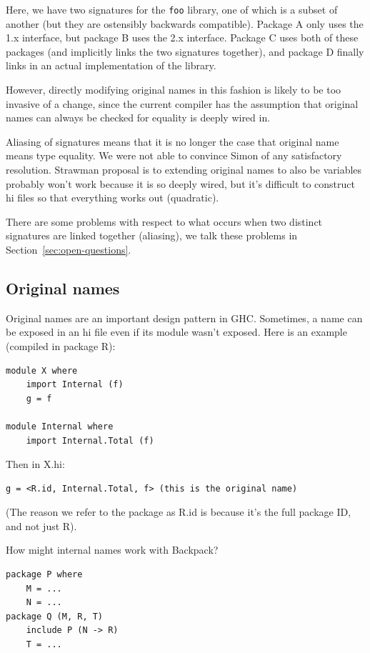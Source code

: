 \documentclass{article}
\begin{document}
Here, we have two signatures for the \verb|foo| library, one of which
is a subset of another (but they are ostensibly backwards compatible).
Package A only uses the 1.x interface, but package B uses the 2.x interface.
Package C uses both of these packages (and implicitly links the two signatures
together), and package D finally links in an actual implementation of the
library.



However, directly modifying original names in this fashion
is likely to be too invasive of a change, since the current compiler has
the assumption that original names can always be checked for equality
is deeply wired in.

Aliasing of signatures means that it is no longer the case that
original name means type equality.  We were not able to convince
Simon of any satisfactory resolution.  Strawman proposal is to
extending original names to also be variables probably won't work
because it is so deeply wired, but it's difficult to construct hi
files so that everything works out (quadratic).


There are some problems with respect to what occurs when two
distinct signatures are linked together (aliasing), we talk these problems in
Section~\ref{sec:open-questions}.

\fi

\subsection{Original names} Original names are an important design pattern
in GHC\@.
Sometimes, a name can be exposed in an hi file even if its module
wasn't exposed. Here is an example (compiled in package R):

\begin{verbatim}
module X where
    import Internal (f)
    g = f

module Internal where
    import Internal.Total (f)
\end{verbatim}

Then in X.hi:

\begin{verbatim}
g = <R.id, Internal.Total, f> (this is the original name)
\end{verbatim}

(The reason we refer to the package as R.id is because it's the
full package ID, and not just R).

How might internal names work with Backpack?

\begin{verbatim}
package P where
    M = ...
    N = ...
package Q (M, R, T)
    include P (N -> R)
    T = ...
\end{verbatim}
\end{document}
